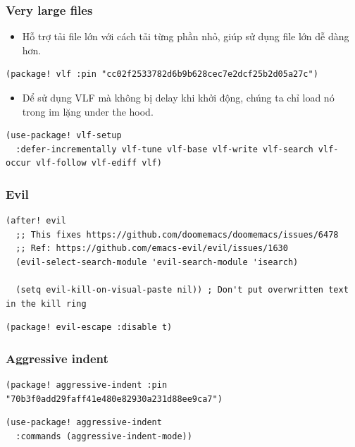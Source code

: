 \documentclass[11pt]{article}
\begin{document}
\subsubsection{Very large files}
\label{sec:org88d5571}
\begin{itemize}
\item Hỗ trợ tải file lớn với cách tải từng phần nhỏ, giúp sử dụng file lớn dễ dàng hơn.
\end{itemize}
\begin{verbatim}
(package! vlf :pin "cc02f2533782d6b9b628cec7e2dcf25b2d05a27c")
\end{verbatim}

\begin{itemize}
\item Dể sử dụng VLF mà không bị delay khi khởi động, chúng ta chỉ load nó trong im
lặng under the hood.
\end{itemize}
\begin{verbatim}
(use-package! vlf-setup
  :defer-incrementally vlf-tune vlf-base vlf-write vlf-search vlf-occur vlf-follow vlf-ediff vlf)
\end{verbatim}

\subsubsection{Evil}
\label{sec:org8c73fc8}

\begin{verbatim}
(after! evil
  ;; This fixes https://github.com/doomemacs/doomemacs/issues/6478
  ;; Ref: https://github.com/emacs-evil/evil/issues/1630
  (evil-select-search-module 'evil-search-module 'isearch)

  (setq evil-kill-on-visual-paste nil)) ; Don't put overwritten text in the kill ring
\end{verbatim}

\begin{verbatim}
(package! evil-escape :disable t)
\end{verbatim}

\subsubsection{Aggressive indent}
\label{sec:org3b37d86}

\begin{verbatim}
(package! aggressive-indent :pin "70b3f0add29faff41e480e82930a231d88ee9ca7")
\end{verbatim}

\begin{verbatim}
(use-package! aggressive-indent
  :commands (aggressive-indent-mode))
\end{verbatim}
\end{document}
